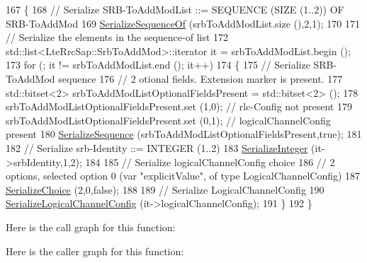\begin{DoxyCode}
167 \{
168   \textcolor{comment}{// Serialize SRB-ToAddModList ::= SEQUENCE (SIZE (1..2)) OF SRB-ToAddMod}
169   \hyperlink{classns3_1_1Asn1Header_a066b6dd077bde6b0c243f3eda2621277}{SerializeSequenceOf} (srbToAddModList.size (),2,1);
170 
171   \textcolor{comment}{// Serialize the elements in the sequence-of list}
172   std::list<LteRrcSap::SrbToAddMod>::iterator it = srbToAddModList.begin ();
173   \textcolor{keywordflow}{for} (; it != srbToAddModList.end (); it++)
174     \{
175       \textcolor{comment}{// Serialize SRB-ToAddMod sequence}
176       \textcolor{comment}{// 2 otional fields. Extension marker is present.}
177       std::bitset<2> srbToAddModListOptionalFieldsPresent = std::bitset<2> ();
178       srbToAddModListOptionalFieldsPresent.set (1,0); \textcolor{comment}{// rlc-Config not present}
179       srbToAddModListOptionalFieldsPresent.set (0,1); \textcolor{comment}{// logicalChannelConfig present}
180       \hyperlink{classns3_1_1Asn1Header_aa9744858380443ed95836fed08799aed}{SerializeSequence} (srbToAddModListOptionalFieldsPresent,\textcolor{keyword}{true});
181 
182       \textcolor{comment}{// Serialize srb-Identity ::= INTEGER (1..2)}
183       \hyperlink{classns3_1_1Asn1Header_ab1c3bd37730affa7473bc759d625c29a}{SerializeInteger} (it->srbIdentity,1,2);
184 
185       \textcolor{comment}{// Serialize logicalChannelConfig choice}
186       \textcolor{comment}{// 2 options, selected option 0 (var "explicitValue", of type LogicalChannelConfig)}
187       \hyperlink{classns3_1_1Asn1Header_a400ef4a710499da80fc55e23a973d4fa}{SerializeChoice} (2,0,\textcolor{keyword}{false});
188 
189       \textcolor{comment}{// Serialize LogicalChannelConfig }
190       \hyperlink{classns3_1_1RrcAsn1Header_a3e43cd3672501a6c4118405157fdeb79}{SerializeLogicalChannelConfig} (it->logicalChannelConfig);
191     \}
192 \}
\end{DoxyCode}


Here is the call graph for this function\+:




Here is the caller graph for this function\+:


